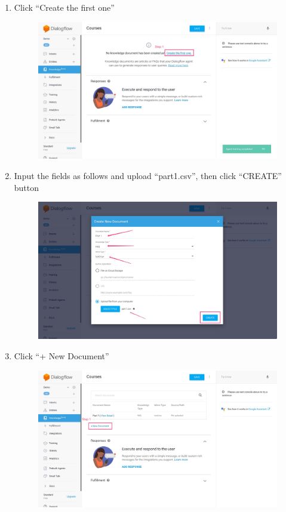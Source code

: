 \begin{enumerate}
	\item Click “Create the first one”
	\nopagebreak
	\begin{figure}[H]
		\centering
		\includegraphics[width=\linewidth, frame]{img/manual_9.jpg}
	\end{figure}

	\item Input the fields as follows and upload “part1.csv”, then click “CREATE” button
	\nopagebreak
	\begin{figure}[H]
		\centering
		\includegraphics[width=\linewidth, frame]{img/manual_10.jpg}
	\end{figure}

	\item Click “+ New Document”
	\nopagebreak
	\begin{figure}[H]
		\centering
		\includegraphics[width=\linewidth, frame]{img/manual_11.jpg}
	\end{figure}


\end{enumerate}
